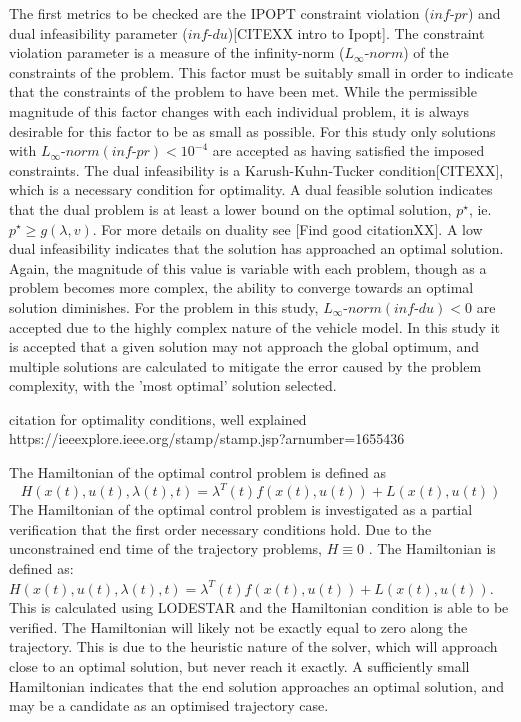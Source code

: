 The first metrics to be checked are the IPOPT constraint violation ($inf\textrm{-}pr$) and dual infeasibility parameter ($inf\textrm{-}du$)[CITEXX intro to Ipopt]. The constraint violation parameter is a measure of the infinity-norm ($L_\infty\textrm{-}norm$) of the constraints of the problem. This factor must be suitably small in order to indicate that the constraints of the problem to have been met. While the permissible magnitude of this factor changes with each individual problem, it is always desirable for this factor to be as small as possible. For this study only solutions with $L_\infty\textrm{-}norm(inf\textrm{-}pr) < 10^{-4} $ are accepted as having satisfied the imposed constraints. The dual infeasibility is a Karush-Kuhn-Tucker condition[CITEXX], which is a necessary condition for optimality. A dual feasible solution indicates that the dual problem is at least a lower bound on the optimal solution, $p^\star$, ie. $p^\star \geq g(\lambda,v)$. For more details on duality see [Find good citationXX].
A low dual infeasibility indicates that the solution has approached an optimal solution. Again, the magnitude of this value is variable with each problem, though as a problem becomes more complex, the ability to converge towards an optimal solution diminishes. For the problem in this study, $L_\infty\textrm{-}norm(inf\textrm{-}du) < 0 $ are accepted due to the highly complex nature of the vehicle model. In this study it is accepted that a given solution may not approach the global optimum, and multiple solutions are calculated to mitigate the error caused by the problem complexity, with the 'most optimal' solution selected. 

citation for optimality conditions, well explained https://ieeexplore.ieee.org/stamp/stamp.jsp?arnumber=1655436

The Hamiltonian of the optimal control problem is defined as 
\begin{equation}
H(x(t),u(t),\lambda(t),t) = \lambda^T(t)f(x(t),u(t)) + L(x(t),u(t))
\end{equation}
The Hamiltonian of the optimal control problem is investigated as a partial verification that the first order necessary conditions hold. Due to the unconstrained end time of the trajectory problems, $H\equiv 0 $ \cite{Pucci2007}. The Hamiltonian is defined as: $H(x(t),u(t),\lambda(t),t) = \lambda^T(t)f(x(t),u(t))+L(x(t),u(t))$.
This is calculated using LODESTAR and the Hamiltonian condition is able to be verified. The Hamiltonian will likely not be exactly equal to zero along the trajectory. This is due to the heuristic nature of the solver, which will approach close to an optimal solution, but never reach it exactly. A sufficiently small Hamiltonian indicates that the end solution approaches an optimal solution, and may be a candidate as an optimised trajectory case. 


